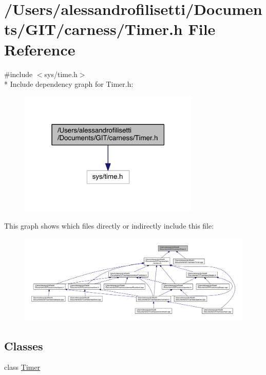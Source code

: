 \hypertarget{a00123}{\section{/\+Users/alessandrofilisetti/\+Documents/\+G\+I\+T/carness/\+Timer.h File Reference}
\label{a00123}
}
{\ttfamily \#include $<$sys/time.\+h$>$}\\*
Include dependency graph for Timer.\+h\+:\nopagebreak
\begin{figure}[H]
\begin{center}
\leavevmode
\includegraphics[width=244pt]{a00209}
\end{center}
\end{figure}
This graph shows which files directly or indirectly include this file\+:\nopagebreak
\begin{figure}[H]
\begin{center}
\leavevmode
\includegraphics[width=350pt]{a00210}
\end{center}
\end{figure}
\subsection*{Classes}
\begin{DoxyCompactItemize}
\item 
class \hyperlink{a00022}{Timer}
\end{DoxyCompactItemize}

